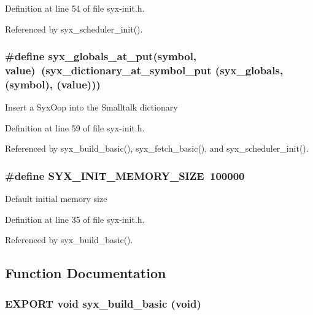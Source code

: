 Definition at line 54 of file syx-init.h.

Referenced by syx\_\-scheduler\_\-init().\hypertarget{syx-init_8h_f23cd621d758fbfffe13f58928e4b068}{
\subsubsection{\setlength{\rightskip}{0pt plus 5cm}\#define syx\_\-globals\_\-at\_\-put(symbol, \/  value)~(syx\_\-dictionary\_\-at\_\-symbol\_\-put ({\bf syx\_\-globals}, (symbol), (value)))}}
\label{syx-init_8h_f23cd621d758fbfffe13f58928e4b068}


Insert a SyxOop into the Smalltalk dictionary 

Definition at line 59 of file syx-init.h.

Referenced by syx\_\-build\_\-basic(), syx\_\-fetch\_\-basic(), and syx\_\-scheduler\_\-init().\hypertarget{syx-init_8h_27a70994157f8571e2c0dd4ee513ab3c}{
\subsubsection{\setlength{\rightskip}{0pt plus 5cm}\#define SYX\_\-INIT\_\-MEMORY\_\-SIZE~100000}}
\label{syx-init_8h_27a70994157f8571e2c0dd4ee513ab3c}


Default initial memory size 

Definition at line 35 of file syx-init.h.

Referenced by syx\_\-build\_\-basic().

\subsection{Function Documentation}
\hypertarget{syx-init_8h_31c41be993642afd482b099c468212d7}{
\subsubsection{\setlength{\rightskip}{0pt plus 5cm}EXPORT void syx\_\-build\_\-basic (void)}}
\label{syx-init_8h_31c41be993642afd482b099c468212d7}


